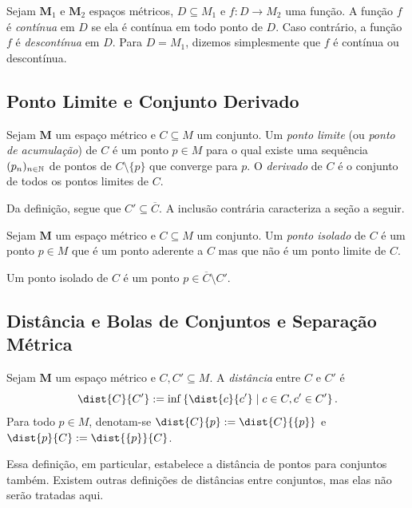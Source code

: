 \begin{defi}
Sejam $\bm M_1$ e $\bm M_2$ espaços métricos, $D \subseteq M_1$ e $f: D \to M_2$ uma função. A função $f$ é \emph{contínua} em $D$ se ela é contínua em todo ponto de $D$. Caso contrário, a função $f$ é \emph{descontínua} em $D$. Para $D=M_1$, dizemos simplesmente que $f$ é contínua ou descontínua.
\end{defi}

\subsection{Ponto Limite e Conjunto Derivado}

\begin{defi}
Sejam $\bm M$ um espaço métrico e $C \subseteq M$ um conjunto. Um \emph{ponto limite} (ou \emph{ponto de acumulação}) de $C$ é um ponto $p \in M$ para o qual existe uma sequência $(p_n)_{n \in \mathbb{N}}$ de pontos de $C \setminus \{p\}$ que converge para $p$. O \emph{derivado} de $C$ é o conjunto de todos os pontos limites de $C$. 
\end{defi}

Da definição, segue que $C' \subseteq \overline C$. A inclusão contrária caracteriza a seção a seguir.

\begin{defi}
Sejam $\bm M$ um espaço métrico e $C \subseteq M$ um conjunto. Um \emph{ponto isolado} de $C$ é um ponto $p \in M$ que é um ponto aderente a $C$ mas que não é um ponto limite de $C$.
\end{defi}

Um ponto isolado de $C$ é um ponto $p \in \overline C \setminus C'$.

\subsection{Distância e Bolas de Conjuntos e Separação Métrica}

\begin{defi}
Sejam $\bm M$ um espaço métrico e $C,C' \subseteq M$. A \emph{distância} entre $C$ e $C'$ é
	\begin{equation*}
	\dist{C}{C'} := \inf \set{\dist{c}{c'}}{c \in C, c' \in C'}.
	\end{equation*}
Para todo $p \in M$, denotam-se $\dist{C}{p} := \dist{C}{\{p\}}$ e $\dist{p}{C} := \dist{\{p\}}{C}$.
\end{defi}

Essa definição, em particular, estabelece a distância de pontos para conjuntos também. Existem outras definições de distâncias entre conjuntos, mas elas não serão tratadas aqui.


